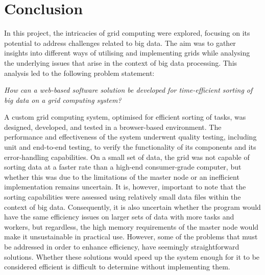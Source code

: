 \chapter{Conclusion}\label{ch:conclusion}

In this project, the intricacies of grid computing were explored, focusing on its potential to address challenges related to big data. The aim was to gather insights into different ways of utilising and implementing grids while analysing the underlying issues that arise in the context of big data processing. This analysis led to the following problem statement:

\begin{center}
\emph{How can a web-based software solution be developed for time-efficient sorting of big data on a grid computing system?}
\end{center}
% 
A custom grid computing system, optimised for efficient sorting of tasks, was designed, developed, and tested in a browser-based environment. The performance and effectiveness of the system underwent quality testing, including unit and end-to-end testing, to verify the functionality of its components and its error-handling capabilities. On a small set of data, the grid was not capable of sorting data at a faster rate than a high-end consumer-grade computer, but whether this was due to the limitations of the master node or an inefficient implementation remains uncertain. It is, however, important to note that the sorting capabilities were assessed using relatively small data files within the context of big data. Consequently, it is also uncertain whether the program would have the same efficiency issues on larger sets of data with more tasks and workers, but regardless, the high memory requirements of the master node would make it unsustainable in practical use. However, some of the problems that must be addressed in order to enhance efficiency, have seemingly straightforward solutions. Whether these solutions would speed up the system enough for it to be considered efficient is difficult to determine without implementing them. 